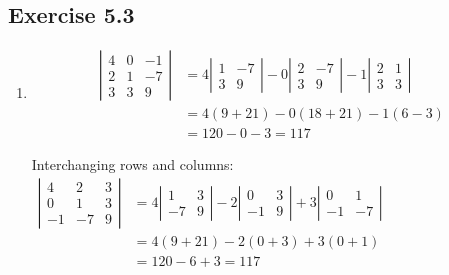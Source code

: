 \documentclass{./../../Latex/homework}
\begin{document}
\thispagestyle{plain}

\subsection*{Exercise 5.3}

\begin{enumerate}
\item 
$$
\begin{aligned}
\left|\begin{array}{ccc}
4 & 0 & -1 \\
2 & 1 & -7 \\
3 & 3 & 9
\end{array}\right| &=4\left|\begin{array}{rr}
1 & -7 \\
3 & 9
\end{array}\right|-0\left|\begin{array}{cc}
2 & -7 \\
3 & 9
\end{array}\right|-1\left|\begin{array}{ll}
2 & 1 \\
3 & 3
\end{array}\right| \\
&=4(9+21)-0(18+21)-1(6-3) \\
&=120-0-3=117
\end{aligned}
$$

Interchanging rows and columns:\\

\( \begin{aligned}\left|\begin{array}{ccc}4 & 2 & 3 \\ 0 & 1 & 3 \\ -1 & -7 & 9\end{array}\right| &=4\left|\begin{array}{cc}1 & 3 \\ -7 & 9\end{array}\right|-2\left|\begin{array}{cc}0 & 3 \\ -1 & 9\end{array}\right|+3\left|\begin{array}{cc}0 & 1 \\ -1 & -7\end{array}\right| \\ &=4(9+21)-2(0+3)+3(0+1) \\ &=120-6+3=117 \end{aligned} \) \\


\end{enumerate}
\end{document}
